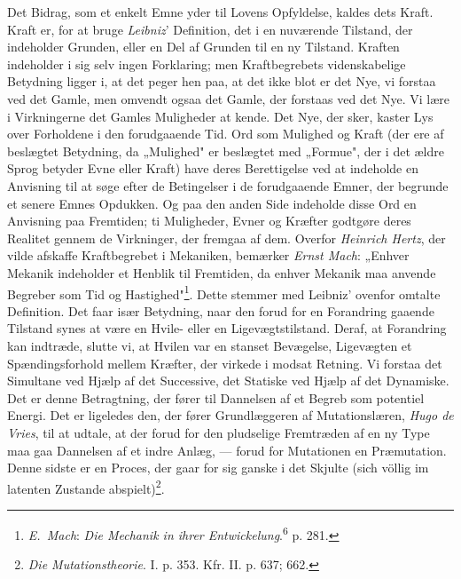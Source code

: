 \documentclass[12pt,a4paper]{book}
\newcommand{\apage}[1]{\marginnote{\footnotesize\textit{[#1]}}}
\begin{document}
Det Bidrag, som et enkelt Emne yder til Lovens Opfyldelse, kaldes dets Kraft.
Kraft er, for at bruge \emph{Leibniz}' \apage{216} Definition, det i en nuværende Tilstand, der
indeholder Grunden, eller en Del af Grunden til en ny Tilstand. Kraften indeholder
i sig selv ingen Forklaring; men Kraftbegrebets videnskabelige Betydning ligger i,
at det peger hen paa, at det ikke blot er det Nye, vi forstaa ved det Gamle, men
omvendt ogsaa det Gamle, der forstaas ved det Nye. Vi lære i Virkningerne det
Gamles Muligheder at kende. Det Nye, der sker, kaster Lys over Forholdene i den
forudgaaende Tid. Ord som Mulighed og Kraft (der ere af beslægtet Betydning, da
„Mulighed" er beslægtet med „Formue", der i det ældre Sprog betyder Evne eller
Kraft) have deres Berettigelse ved at indeholde en Anvisning til at søge efter de
Betingelser i de forudgaaende Emner, der begrunde et senere Emnes Opdukken. Og paa
den anden Side indeholde disse Ord en Anvisning paa Fremtiden; ti Muligheder, Evner
og Kræfter godtgøre deres Realitet gennem de Virkninger, der fremgaa af dem.
Overfor \emph{Heinrich Hertz}, der vilde afskaffe Kraftbegrebet i Mekaniken,
bemærker \emph{Ernst Mach}: „Enhver Mekanik indeholder et Henblik til Fremtiden, da
enhver Mekanik maa anvende Begreber som Tid og Hastighed"\footnote{\emph{E.\ Mach}:
\emph{Die Mechanik in ihrer Entwickelung}.\textsuperscript{6} p. 281.}. Dette
stemmer med Leibniz' ovenfor omtalte Definition. Det faar især Betydning, naar den
forud for en Forandring gaaende Tilstand synes at være en Hvile- eller en Ligevægtstilstand. Deraf, at Forandring kan indtræde, slutte vi, at Hvilen var en
stanset Bevægelse, Ligevægten et Spændingsforhold mellem Kræfter, der virkede i
modsat Retning. Vi forstaa det Simultane ved Hjælp af det Successive, det Statiske
ved Hjælp af det Dynamiske. Det er denne Betragtning, der fører til Dannelsen af et
Begreb som potentiel Energi. Det er ligeledes den, der fører Grundlæggeren af
Mutationslæren, \emph{Hugo de Vries}, til at udtale, at der forud for den
pludselige Fremtræden af en ny Type maa gaa Dannelsen af et indre Anlæg, --- forud
for Mutationen en Præmutation. Denne sidste er en Proces, der gaar for sig ganske i
det Skjulte (sich völlig im latenten Zustande abspielt)\footnote{\emph{Die
Mutationstheorie}. I. p. 353. Kfr. II. p. 637; 662.}.
\end{document}
